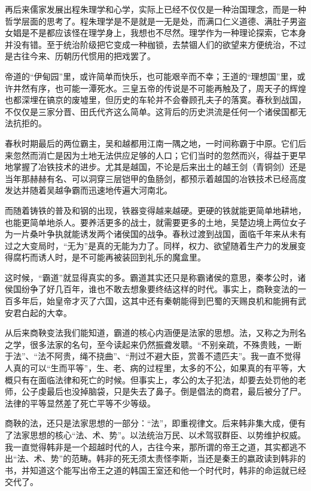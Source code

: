 \documentclass[]{book}
\begin{document}
再后来儒家发展出程朱理学和心学，实际上已经不仅仅是一种治国理念，而是一种哲学层面的思考了。程朱理学是不是就是一无是处，而满口仁义道德、满肚子男盗女娼是不是都应该怪在理学身上，我想也不尽然。理学作为一种理论探索，它本身并没有错。至于统治阶级把它变成一种枷锁，去禁锢人们的欲望来方便统治，不过是古往今来、历朝历代惯用的把戏罢了。

帝道的``伊甸园''里，或许简单而快乐，也可能艰辛而不幸；王道的``理想国''里，或许井然有序，也可能一潭死水。三皇五帝的传说是不可能再触及了，周天子的辉煌也都深埋在镐京的废墟里，但历史的车轮并不会眷顾孔夫子的落寞。春秋到战国，不仅仅是三家分晋、田氏代齐这么简单。这背后的历史洪流是任何一个诸侯国都无法抗拒的。

春秋时期最后的两位霸主，吴和越都用江南一隅之地，一时间称霸于中原。它们后来忽然而消亡是因为土地无法供应足够的人口；它们当时的忽然而兴，得益于更早地掌握了冶铁技术的进步。尤其是越国，不论是后来出土的越王剑（青铜剑）还是当年那赫赫有名、可以洞穿三层铠甲的鱼肠剑，都预示着越国的冶铁技术已经高度发达并随着吴越争霸而迅速地传遍大河南北。

而随着铸铁的普及和钢的出现，铁器变得越来越硬。更硬的铁就能更简单地耕地，也能更简单地杀人。要养活更多的战士，就需要更多的土地，吴楚边境上两位女子为一片桑叶争执就能诱发两个诸侯国的战争。春秋过渡到战国，面临千年来从未有过之大变局时，``无为''是真的无能为力了。同样，权力、欲望随着生产力的发展变得腐朽而诱人时，是不可能再被装回到礼乐的魔盒里。

这时候，``霸道''就显得真实的多。霸道其实还只是称霸诸侯的意思，秦孝公时，诸侯国纷争了好几百年，谁也不敢去想象要终结这样的时代。事实上，商鞅变法的一百多年后，始皇帝才灭了六国，这其中还有秦朝能得到巴蜀的天赐良机和能拥有武安君白起的大幸。

从后来商鞅变法我们能知道，霸道的核心内涵便是法家的思想。法，又称之为刑名之学，很多法家的名句，至今读起来仍然振聋发聩。``不别亲疏，不殊贵贱，一断于法''、``法不阿贵，绳不挠曲''、``刑过不避大臣，赏善不遗匹夫''。我一直不觉得人真的可以``生而平等''，生、老、病的过程里，太多的不公，如果真的有平等，大概只有在面临法律和死亡的时候。但事实上，孝公的太子犯法，却要去处罚他的老师，公子虔最后也没掉脑袋，只是失去了鼻子。倒是倡法的商君，最后被分了尸。法律的平等显然差了死亡平等不少等级。

商鞅的法，还只是法家思想的一部分：``法''，即重视律文。后来韩非集大成，便有了法家思想的核心``法、术、势''。以法统治万民、以术驾驭群臣、以势维护权威。我一直觉得韩非是一个超越时代的人，古往今来，那所谓的帝王之道，其实都逃不出``法、术、势''的范畴。韩非的死无须太责怪李斯，当还是秦王的嬴政读到韩非的书，并知道这个能写出帝王之道的韩国王室还和他一个时代时，韩非的命运就已经交代了。
\end{document}
